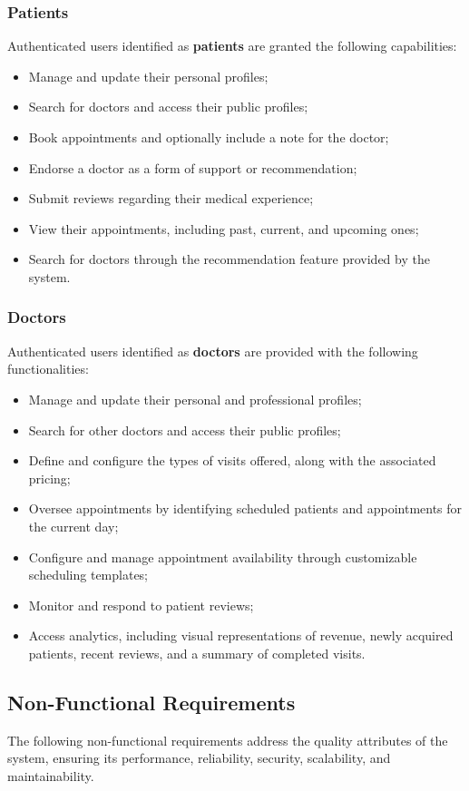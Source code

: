 \subsubsection{Patients}
Authenticated users identified as \textbf{patients} are granted the following capabilities:
\begin{itemize}
	\item Manage and update their personal profiles;
	\item Search for doctors and access their public profiles;
	\item Book appointments and optionally include a note for the doctor;
	\item Endorse a doctor as a form of support or recommendation;
	\item Submit reviews regarding their medical experience;
	\item View their appointments, including past, current, and upcoming ones;
	\item Search for doctors through the recommendation feature provided by the system.
\end{itemize}

\subsubsection{Doctors}
Authenticated users identified as \textbf{doctors} are provided with the following functionalities:
\begin{itemize}
	\item Manage and update their personal and professional profiles;
	\item Search for other doctors and access their public profiles;
	\item Define and configure the types of visits offered, along with the associated pricing;
	\item Oversee appointments by identifying scheduled patients and appointments for the current day;
	\item Configure and manage appointment availability through customizable scheduling templates;
	\item Monitor and respond to patient reviews;
	\item Access analytics, including visual representations of revenue, newly acquired patients, recent reviews, and a summary of completed visits.
\end{itemize}

\subsection{Non-Functional Requirements}
The following non-functional requirements address the quality attributes of the system, ensuring its performance, reliability, security, scalability, and maintainability.

